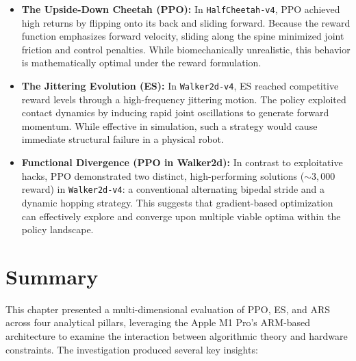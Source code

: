 \begin{itemize}
    \item \textbf{The Upside-Down Cheetah (PPO):} In \texttt{HalfCheetah-v4}, PPO achieved high returns by flipping onto its back and sliding forward. Because the reward function emphasizes forward velocity, sliding along the spine minimized joint friction and control penalties. While biomechanically unrealistic, this behavior is mathematically optimal under the reward formulation.
    
    \item \textbf{The Jittering Evolution (ES):} In \texttt{Walker2d-v4}, ES reached competitive reward levels through a high-frequency jittering motion. The policy exploited contact dynamics by inducing rapid joint oscillations to generate forward momentum. While effective in simulation, such a strategy would cause immediate structural failure in a physical robot.
    
    \item \textbf{Functional Divergence (PPO in Walker2d):} In contrast to exploitative hacks, PPO demonstrated two distinct, high-performing solutions ($\sim 3,000$ reward) in \texttt{Walker2d-v4}: a conventional alternating bipedal stride and a dynamic hopping strategy. This suggests that gradient-based optimization can effectively explore and converge upon multiple viable optima within the policy landscape.
\end{itemize}

\section{Summary}

This chapter presented a multi-dimensional evaluation of PPO, ES, and ARS across four analytical pillars, leveraging the Apple M1 Pro's ARM-based architecture to examine the interaction between algorithmic theory and hardware constraints. The investigation produced several key insights:

